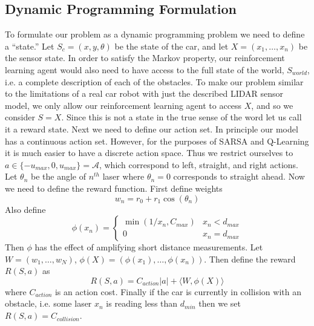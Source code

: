 \documentclass{article}
\begin{document}
\subsection{Dynamic Programming Formulation}
To formulate our problem as a dynamic programming problem we need to define a ``state.'' Let $S_c = (x,y,\theta)$ be the state of the car, and let $X  = (x_1,\ldots,x_n)$ be the sensor state. In order to satisfy the Markov property, our reinforcement learning agent would also need to have access to the full state of the world, $S_{world}$, i.e. a complete description of each of the obstacles.  To make our problem similar to the limitations of a real car robot with just the described LIDAR sensor model, we only allow our reinforcement learning agent to access $X$, and so we consider $S = X$. Since this is not a state in the true sense of the word let us call it a reward state.  Next we need to define our action set. In principle our model has a continuous action set. However, for the purposes of SARSA and Q-Learning it is much easier to have a discrete action space. Thus we restrict ourselves to $a \in \{-u_{max},0,u_{max}\} = \mathcal{A}$, which correspond to left, straight, and right actions. Let $\theta_n$ be the angle of $n^{th}$ laser where $\theta_n = 0$ corresponds to straight ahead. Now we need to define the reward function. First define weights
%
%
\begin{equation}
w_n = r_0 + r_1 \cos(\theta_n)
\end{equation}
%
%
Also define
%
%
\begin{equation}
\phi(x_n) = \begin{cases}
\min(1/x_n, C_{max}) & x_n < d_{max}\\
0 & x_n = d_{max} 
\end{cases}
\end{equation}
%
%
Then $\phi$ has the effect of amplifying short distance measurements. Let $W = (w_1,\ldots,w_N)$, $\phi(X) = (\phi(x_1),\ldots,\phi(x_n))$. Then define the reward $R(S,a)$ as
%
%
\begin{equation}
R(S,a) = C_{action} |a| + \langle W, \phi(X) \rangle
\end{equation}
%
%
where $C_{action}$ is an action cost. Finally if the car is currently in collision with an obstacle, i.e. some laser $x_n$ is reading less than $d_{min}$ then we set $R(S,a) = C_{collision}$.
\end{document}
